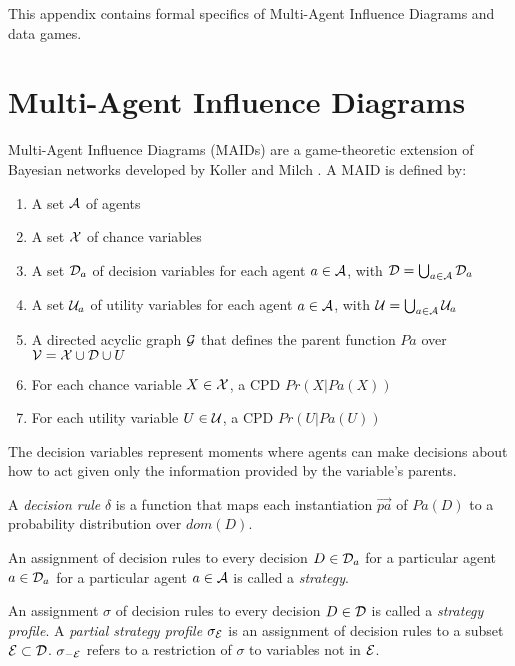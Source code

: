\documentclass[../thesis.tex]{subfiles}
\begin{document}
 This appendix contains formal specifics of Multi-Agent Influence
 Diagrams and data games.
 
\section{Multi-Agent Influence Diagrams}
 
Multi-Agent Influence Diagrams (MAIDs) are a game-theoretic
extension of Bayesian networks developed by Koller and Milch
\cite{koller2003multi}.
A MAID is defined by:
\begin{enumerate}
\item A set $\mathcal{A}$ of agents 
\item A set $\mathcal{X}$ of chance variables
\item A set $\mathcal{D}_a$ of decision variables for each agent $a \in \mathcal{A}$,
  with $\mathcal{D} = \bigcup_{a \in \mathcal{A}} \mathcal{D}_a$
\item A set $\mathcal{U}_a$ of utility variables for each agent $a \in \mathcal{A}$,
  with $\mathcal{U} = \bigcup_{a \in \mathcal{A}} \mathcal{U}_a$
\item A directed acyclic graph $\mathcal{G}$ that defines the parent function
  $Pa$ over $\mathcal{V} = \mathcal{X} \cup \mathcal{D} \cup{U}$
\item For each chance variable $X \in \mathcal{X}$, a CPD $Pr(X \vert Pa(X))$
\item For each utility variable $U \in \mathcal{U}$, a CPD $Pr(U \vert Pa(U))$
\end{enumerate}

The decision variables represent moments where agents can
make decisions about how to act given only the information
provided by the variable's parents.

\begin{dfn}
  \label{dfn:decision-rule}
  A \emph{decision rule} $\delta$ is a function that maps each instantiation
  $\vec{pa}$ of $Pa(D)$ to a probability distribution over $dom(D)$.
\end{dfn}

\begin{dfn}[Strategy]
  \label{dfn:strategy}
  An assignment of decision rules to every decision $D \in \mathcal{D}_a$
  for a particular agent $a \in \mathcal{D}_a$ for a particular agent
  $a \in \mathcal{A}$ is called a \emph{strategy}.
\end{dfn}

\begin{dfn}
  An assignment $\sigma$ of decision rules to every decision
  $D \in \mathcal{D}$ is called a \emph{strategy profile}.
  A \emph{partial strategy profile} $\sigma_\mathcal{E}$ is
  an assignment of decision rules to a subset $\mathcal{E} \subset \mathcal{D}$.
  $\sigma_{-\mathcal{E}}$ refers to a restriction of $\sigma$ to variables
  not in $\mathcal{E}$.
\end{dfn}
\end{document}
